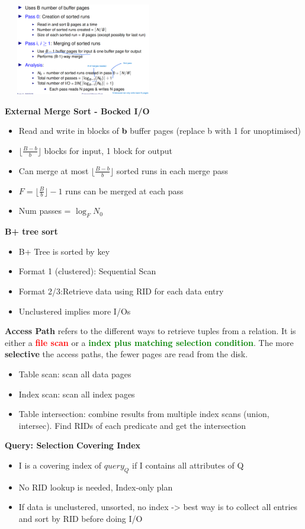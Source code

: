 \documentclass[10pt, landscape]{article}
\newcommand{\floor}[1]{\lfloor #1 \rfloor}
\begin{document}
\begin{multicols}{4}
\includegraphics[width=7cm, height=4cm]{ext_sort.png}

\textbf{External Merge Sort - Bocked I/O}
\begin{itemize}
  \item Read and write in blocks of \textbf{b} buffer pages (replace b with 1 for unoptimised)
  \item $\floor{\frac{B-b}{b}}$ blocks for input, 1 block for output
  \item Can merge at most $\floor{\frac{B-b}{b}}$ sorted runs in each merge pass
  \item $F=\floor{\frac{B}{b}} - 1$ runs can be merged at each pass
  \item Num passes = $\log_{F} N_0$
\end{itemize}

\textbf{B+ tree sort}
\begin{itemize}
  \item B+ Tree is sorted by key
  \item Format 1 (clustered): Sequential Scan 
  \item Format 2/3:Retrieve data using RID for each data entry 
  \item Unclustered implies more I/Os
\end{itemize}

\textbf{Access Path} refers to the different ways to retrieve tuples from a relation. It is either a \textbf{\textcolor{red}{file scan}} or a \textbf{\textcolor{green}{index plus matching selection condition}}. The more \textbf{selective} the access paths, the fewer pages are read from the disk.
\begin{itemize}
  \item Table scan: scan all data pages 
  \item Index scan: scan all index pages 
  \item Table intersection: combine results from multiple index scans (union, intersec). Find RIDs of each predicate and get the intersection
\end{itemize}

\textbf{Query: Selection}
\textbf{Covering Index}
\begin{itemize}
  \item I is a covering index of $query_Q$ if I contains all attributes of Q
  \item No RID lookup is needed, Index-only plan
  \item If data is unclustered, unsorted, no index -> best way is to collect all entries and sort by RID before doing I/O 
\end{itemize}


\end{multicols}
\end{document}
